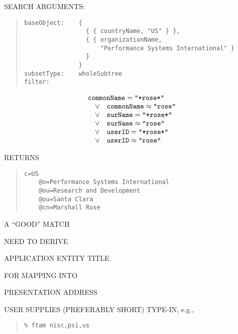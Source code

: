 \begin{bwslide}

\begin{nrtc}
\item	SEARCH ARGUMENTS:
\begin{quote}\small\begin{verbatim}
baseObject:    {
                 { { countryName, "US" } },
                 { { organizationName,
                     "Performance Systems International" }
                 }
               }
subsetType:    wholeSubtree
filter:
\end{verbatim}\end{quote}
\[\begin{array}{lll}
\multicolumn{3}{l}{\mbox{\tt commonName}=\mbox{\tt "*rose*"}}\\
&	\lor&	\mbox{\tt commonName}\approx\mbox{\tt "rose"}\\
&	\lor&	\mbox{\tt surName}=\mbox{\tt "*rose*"}\\
&	\lor&	\mbox{\tt surName}\approx\mbox{\tt "rose"}\\
&	\lor&	\mbox{\tt userID}=\mbox{\tt "*rose*"}\\
&	\lor&	\mbox{\tt userID}\approx\mbox{\tt "rose"}
\end{array}\]

\item	RETURNS
\begin{quote}\small\begin{verbatim}
c=US
    @o=Performance Systems International
    @ou=Research and Development
    @ou=Santa Clara
    @cn=Marshall Rose
\end{verbatim}\end{quote}
A ``GOOD'' MATCH
\end{nrtc}
\end{bwslide}


\begin{bwslide}

\begin{nrtc}
\item	NEED TO DERIVE
    \begin{nrtc}
    \item	APPLICATION ENTITY TITLE
    \end{nrtc}

\item	FOR MAPPING INTO
    \begin{nrtc}
    \item	PRESENTATION ADDRESS
    \end{nrtc}

\item	USER SUPPLIES (PREFERABLY SHORT) TYPE-IN, e.g.,
\begin{quote}\small\begin{verbatim}
% ftam nisc,psi,us
\end{verbatim}\end{quote}
\end{nrtc}
\end{bwslide}


